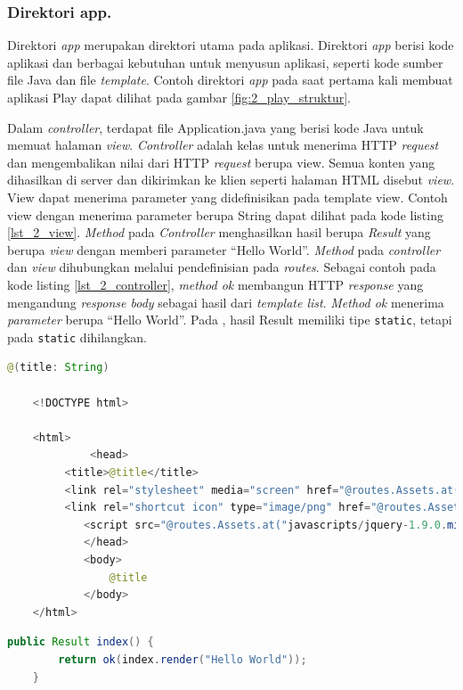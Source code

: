 \subsubsection{Direktori app.}
Direktori \textit{app} merupakan direktori utama pada aplikasi. Direktori \textit{app} berisi kode aplikasi dan berbagai kebutuhan untuk menyusun aplikasi, seperti kode sumber file Java dan file \textit{template}. Contoh direktori \textit{app} pada saat pertama kali membuat aplikasi Play dapat dilihat pada gambar \ref{fig:2_play_struktur}. 

Dalam \textit{controller}, terdapat file Application.java yang berisi kode Java untuk memuat halaman \textit{view}. \textit{Controller} adalah kelas untuk menerima HTTP \textit{request} dan mengembalikan nilai dari HTTP \textit{request} berupa view. Semua konten yang dihasilkan di server dan dikirimkan ke klien seperti halaman HTML disebut \textit{view}. View dapat menerima parameter yang didefinisikan pada template view. Contoh view dengan menerima parameter berupa String dapat dilihat pada kode listing \ref{lst_2_view}. \textit{Method} pada \textit{Controller} menghasilkan hasil berupa \textit{Result} yang berupa \textit{view} dengan memberi parameter ``Hello World''. \textit{Method} pada \textit{controller} dan \textit{view} dihubungkan melalui pendefinisian pada \textit{routes}. Sebagai contoh pada kode listing \ref{lst_2_controller}, \textit{method ok} membangun HTTP \textit{response} yang mengandung \textit{response body} sebagai hasil dari \textit{template list}. \textit{Method ok} menerima \textit{parameter} berupa ``Hello World''. Pada \cite{playforjava}, hasil Result memiliki tipe \verb!static!, tetapi pada  \verb!static! dihilangkan.

\begin{lstlisting}[caption=Contoh View (index.scala.html),label = {lst_2_view},language=Java]
@(title: String)

	<!DOCTYPE html>

	<html>
    		 <head>
       	 <title>@title</title>
       	 <link rel="stylesheet" media="screen" href="@routes.Assets.at("stylesheets/main.css")">
       	 <link rel="shortcut icon" type="image/png" href="@routes.Assets.at("images/favicon.png")">
        	<script src="@routes.Assets.at("javascripts/jquery-1.9.0.min.js")" type="text/javascript"></script>
    		</head>
    		<body>
        		@title
    		</body>
	</html>
\end{lstlisting}


\begin{lstlisting}[caption=Contoh Controller,label = {lst_2_controller},language=Java]
	public Result index() {
        return ok(index.render("Hello World"));
    }
\end{lstlisting}


